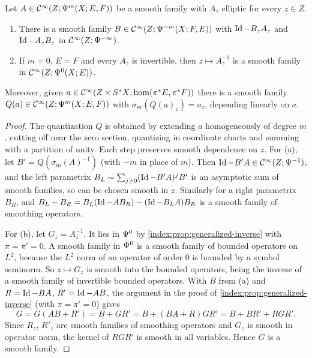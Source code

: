 \begin{lemma}\label{index:lem:family-parametrix}
  Let $A\in\mathcal{C}^\infty(Z;\Psi^{m}(X;E,F))$ be a smooth family with $A_z$ elliptic for
  every $z\in Z$.
  \begin{enumerate}[label=(\alph*)]
  \item There is a smooth family $B\in\mathcal{C}^\infty(Z;\Psi^{-m}(X;F,E))$ with
    $\operatorname{Id}-B_zA_z$ and $\operatorname{Id}-A_zB_z$ in $\mathcal{C}^\infty(Z;\Psi^{-\infty})$.
  \item If $m=0$, $E=F$ and every $A_z$ is invertible, then
    $z\mapsto A_z^{-1}$ is a smooth family in $\mathcal{C}^\infty(Z;\Psi^{0}(X;E))$.
  \end{enumerate}
  Moreover, given $a\in\mathcal{C}^\infty(Z\times S^*X;\hom(\pi^*E,\pi^*F))$ there is a smooth
  family $Q(a)\in\mathcal{C}^\infty(Z;\Psi^{m}(X;E,F))$ with $\sigma_m(Q(a)_z)=a_z$,
  depending linearly on $a$.
\end{lemma}
\begin{proof}
  The quantization $Q$ is obtained by extending $a$ homogeneously of degree $m$,
  cutting off near the zero section, quantizing in coordinate charts and
  summing with a partition of unity. Each step preserves smooth dependence on
  $z$. For (a), let $B'=Q(\sigma_m(A)^{-1})$ (with $-m$ in place of $m$). Then
  $\operatorname{Id}-B'A\in\mathcal{C}^\infty(Z;\Psi^{-1})$, and the left parametrix
  $B_L\sim\sum_{j\ge0}(\operatorname{Id}-B'A)^jB'$ is an asymptotic sum of smooth families,
  so can be chosen smooth in $z$. Similarly for a right parametrix $B_R$, and
  $B_L-B_R=B_L(\operatorname{Id}-AB_R)-(\operatorname{Id}-B_LA)B_R$ is a smooth family of smoothing
  operators.

  For (b), let $G_z=A_z^{-1}$. It lies in $\Psi^{0}$ by
  \cref{index:prop:generalized-inverse} with $\pi=\pi'=0$. A smooth family in
  $\Psi^{0}$ is a smooth family of bounded operators on $L^2$, because the
  $L^2$ norm of an operator of order $0$ is bounded by a symbol seminorm. So
  $z\mapsto G_z$ is smooth into the bounded operators, being the inverse of a
  smooth family of invertible bounded operators. With $B$ from (a) and
  $R=\operatorname{Id}-BA$, $R'=\operatorname{Id}-AB$, the argument in the proof of
  \cref{index:prop:generalized-inverse} (with $\pi=\pi'=0$) gives
  \begin{equation*}
    G=G(AB+R')=B+GR'=B+(BA+R)GR'=B+BR'+RGR'.
  \end{equation*}
  Since $R_z$, $R'_z$ are smooth families of smoothing operators and $G_z$ is
  smooth in operator norm, the kernel of $RGR'$ is smooth in all variables.
  Hence $G$ is a smooth family.
\end{proof}

